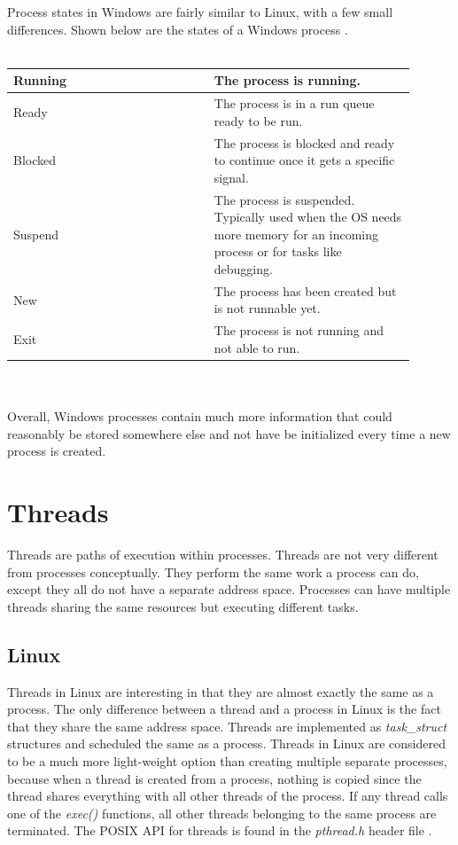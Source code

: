 \documentclass[10pt,draftclsnofoot,onecolumn,journal,compsoc]{IEEEtran}
\begin{document}
Process states in Windows are fairly similar to Linux, with a few small differences. Shown below are the states of a Windows process \cite{win_proc4}. \\ \\

\begin{tabular}{ | p{0.45\linewidth} | p{0.45\linewidth} | }
    \hline
    Running & The process is running. \\ \hline
    Ready & The process is in a run queue ready to be run. \\ \hline
    Blocked & The process is blocked and ready to continue once it gets a specific signal. \\ \hline
    Suspend & The process is suspended. Typically used when the OS needs more memory for an incoming process or for tasks like debugging. \\ \hline
    New & The process has been created but is not runnable yet. \\ \hline
    Exit & The process is not running and not able to run. \\ \hline
\end{tabular} \\ \\ 

Overall, Windows processes contain much more information that could reasonably be stored somewhere else and not have be initialized every time a new process is created.

\section{Threads}
Threads are paths of execution within processes. Threads are not very different from processes conceptually. They perform the same work a process can do, except they all do not have a separate address space. Processes can have multiple threads sharing the same resources but executing different tasks. 

\subsection{Linux}
Threads in Linux are interesting in that they are almost exactly the same as a process. The only difference between a thread and a process in Linux is the fact that they share the same address space. Threads are implemented as \textit{task\_struct} structures and scheduled the same as a process. Threads in Linux are considered to be a much more light-weight option than creating multiple separate processes, because when a thread is created from a process, nothing is copied since the thread shares everything with all other threads of the process. If any thread calls one of the \textit{exec()} functions, all other threads belonging to the same process are terminated. The POSIX API for threads is found in the \textit{pthread.h} header file \cite{linux_thrd}. 
\end{document}
